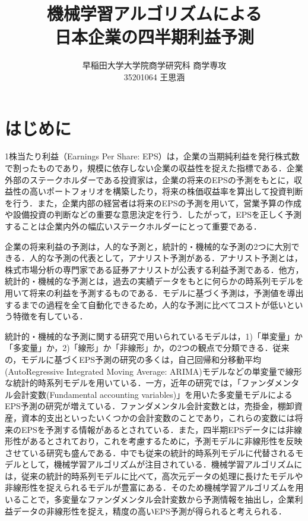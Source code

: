 \documentclass[a4paper，12pt]{jsarticle}
\title{機械学習アルゴリズムによる\\
  日本企業の四半期利益予測}
\author{早稲田大学大学院商学研究科 商学専攻\\
  35201064 王思涵}
\begin{document}
\maketitle
\tableofcontents

\part{はじめに}

1株当たり利益（Earnings Per Share: EPS）は，企業の当期純利益を発行株式数で割ったものであり，規模に依存しない企業の収益性を捉えた指標である．企業外部のステークホルダーである投資家は，企業の将来のEPSの予測をもとに，収益性の高いポートフォリオを構築したり，将来の株価収益率を算出して投資判断を行う．また，企業内部の経営者は将来のEPSの予測を用いて，営業予算の作成や設備投資の判断などの重要な意思決定を行う．したがって，EPSを正しく予測することは企業内外の幅広いステークホルダーにとって重要である．

企業の将来利益の予測は，人的な予測と，統計的・機械的な予測の2つに大別できる\citep{sakurai1990}．人的な予測の代表として，アナリスト予測がある．アナリスト予測とは，株式市場分析の専門家である証券アナリストが公表する利益予測である．他方，統計的・機械的な予測とは，過去の実績データをもとに何らかの時系列モデルを用いて将来の利益を予測するものである．モデルに基づく予測は，予測値を導出するまでの過程を全て自動化できるため，人的な予測に比べてコストが低いという特徴を有している\citep{sakurai1990}．

統計的・機械的な予測に関する研究で用いられているモデルは，1)「単変量」か「多変量」か，2)「線形」か「非線形」か，の2つの観点で分類できる\citep{zhang2004neural}．従来の，モデルに基づくEPS予測の研究の多くは，自己回帰和分移動平均(AutoRegressive Integrated Moving Average: ARIMA)モデル\citep*{box2015time}などの単変量で線形な統計的時系列モデルを用いている\citep*{foster1977quarterly, griffin1977time, brown1979univariate}．一方，近年の研究では，「ファンダメンタル会計変数(Fundamental accounting variables)」を用いた多変量モデルによるEPS予測の研究が増えている．ファンダメンタル会計変数とは，売掛金，棚卸資産，資本的支出といったいくつかの会計変数のことであり，これらの変数には将来のEPSを予測する情報があるとされている\citep*{lev1993fundamental, abarbanell1997fundamental}．また，四半期EPSデータには非線形性があるとされており\citep*{hopwood1986univariate}，これを考慮するために，予測モデルに非線形性を反映させている研究も盛んである．中でも従来の統計的時系列モデルに代替されるモデルとして，機械学習アルゴリズムが注目されている．機械学習アルゴリズムには，従来の統計的時系列モデルに比べて，高次元データの処理に長けたモデルや非線形性を捉えられるモデルが豊富にある\citep*{cao2020fundamental}．そのため機械学習アルゴリズムを用いることで，多変量なファンダメンタル会計変数から予測情報を抽出し，企業利益データの非線形性を捉え，精度の高いEPS予測が得られると考えられる．
\end{document}

